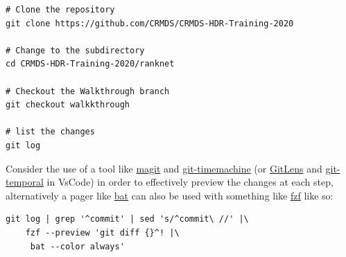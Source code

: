 \documentclass[a4paper,11pt,twoside]{article}
\begin{document}
\begin{verbatim}
# Clone the repository
git clone https://github.com/CRMDS/CRMDS-HDR-Training-2020

# Change to the subdirectory
cd CRMDS-HDR-Training-2020/ranknet

# Checkout the Walkthrough branch
git checkout walkkthrough

# list the changes
git log
\end{verbatim}

Consider the use of a tool like \href{https://magit.vc/}{magit} and \href{https://github.com/emacsmirror/git-timemachine}{git-timemachine} (or
\href{https://marketplace.visualstudio.com/items?itemName=eamodio.gitlens}{GitLens} and \href{https://marketplace.visualstudio.com/items?itemName=bee.git-temporal-vscode}{git-temporal} in VsCode) in order to effectively preview
the changes at each step, alternatively a pager like \href{https://github.com/sharkdp/bat}{bat} can also
be used with something like \href{https://github.com/junegunn/fzf}{fzf} like so:

\begin{verbatim}
git log | grep '^commit' | sed 's/^commit\ //' |\
    fzf --preview 'git diff {}^! |\
     bat --color always'  
\end{verbatim}
\end{document}
